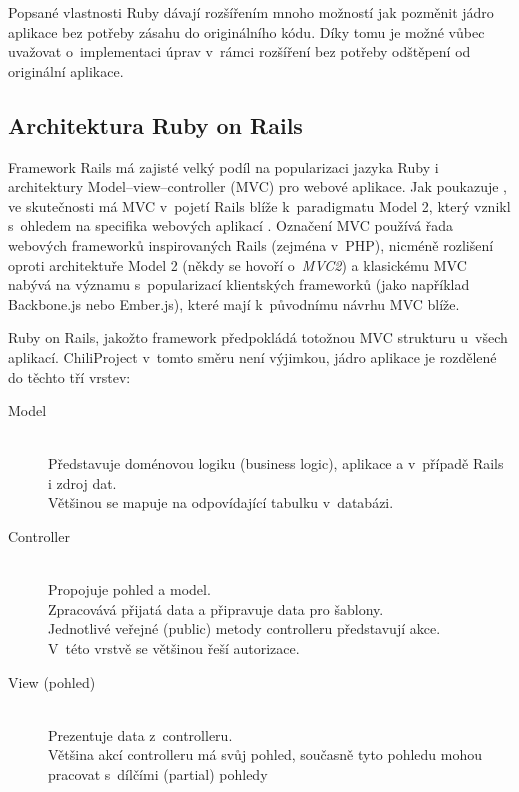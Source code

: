 \documentclass[thesis=B,czech]{FITthesis}[2012/05/02]
\begin{document}
Popsané vlastnosti Ruby dávají rozšířením mnoho možností jak pozměnit jádro
aplikace bez potřeby zásahu do originálního kódu. Díky tomu je možné
vůbec uvažovat o~implementaci úprav v~rámci rozšíření bez potřeby
odštěpení od originální aplikace.

\subsection{Architektura Ruby on Rails}

Framework Rails má zajisté velký podíl na popularizaci jazyka Ruby i
architektury Model--view--controller (MVC) pro webové aplikace. Jak
poukazuje \citep{Krzywda2011}, ve skutečnosti má MVC v~pojetí Rails
blíže k~paradigmatu Model 2, který vznikl s~ohledem na specifika
webových aplikací \citep{McCallister2004}. Označení MVC používá řada
webových frameworků inspirovaných Rails (zejména v~PHP), nicméně
rozlišení oproti architektuře Model 2 (někdy se hovoří o~\emph{MVC2}) a
klasickému MVC nabývá na významu s~popularizací klientských frameworků
(jako například Backbone.js nebo Ember.js), které mají k~původnímu
návrhu MVC blíže.

Ruby on Rails, jakožto  framework \citep[kpt. 4, Make
Opinionated Software]{Fried2009}
předpokládá totožnou MVC strukturu u~všech aplikací. ChiliProject
v~tomto směru není výjimkou, jádro aplikace je rozdělené do těchto tří vrstev:

\begin{description}
\item[Model] \hfill \\
Představuje doménovou logiku (business logic), aplikace a v~případě Rails i zdroj dat. \hfill \\
Většinou se mapuje na odpovídající tabulku v~databázi.
\item[Controller] \hfill \\
Propojuje pohled a model. \hfill \\
Zpracovává přijatá data a připravuje data pro šablony. \hfill \\
Jednotlivé veřejné (public) metody controlleru představují akce. \hfill \\
V~této vrstvě se většinou řeší autorizace.
\item[View (pohled)] \hfill \\
Prezentuje data z~controlleru. \hfill \\
Většina akcí controlleru má svůj pohled, současně tyto pohledu mohou pracovat s~dílčími (partial) pohledy
\end{description}
\end{document}

